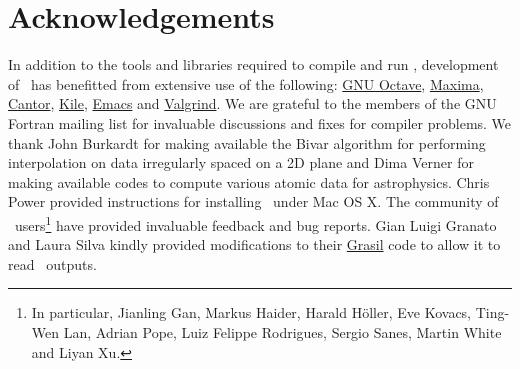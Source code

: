\chapter{Acknowledgements}

In addition to the tools and libraries required to compile and run \glc, development of \glc\ has benefitted from extensive use of the following: \href{http://www.gnu.org/software/octave/}{{\sc GNU Octave}}, \href{http://maxima.sourceforge.net/}{{\sc Maxima}}, \href{http://edu.kde.org/cantor/}{{\sc Cantor}}, \href{http://kile.sourceforge.net/}{{\sc Kile}}, \href{http://www.gnu.org/software/emacs/}{{\sc Emacs}} and \href{http://valgrind.org/}{{\sc Valgrind}}. We are grateful to the members of the {\sc GNU Fortran} mailing list for invaluable discussions and fixes for compiler problems. We thank John Burkardt for making available the {\sc Bivar} algorithm for performing interpolation on data irregularly spaced on a 2D plane and Dima Verner for making available codes to compute various atomic data for astrophysics. Chris Power provided instructions for installing \glc\ under Mac OS X. The community of \glc\ users\footnote{In particular, Jianling Gan, Markus Haider, Harald H\"oller, Eve Kovacs, Ting-Wen Lan, Adrian Pope, Luiz Felippe Rodrigues, Sergio Sanes, Martin White and Liyan Xu.} have provided invaluable feedback and bug reports. Gian Luigi Granato and Laura Silva kindly provided modifications to their \href{http://adlibitum.oat.ts.astro.it/silva/grasil/grasil.html}{\sc Grasil} code to allow it to read \glc\ outputs.
